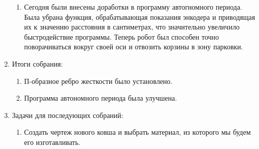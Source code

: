 \begin{enumerate}
\begin{enumerate}
	  \item Сегодня были внесены доработки в программу автогномного периода. Была убрана функция, обрабатывающая показания энкодера и приводящая их к значению расстояния в сантиметрах, что значительно увеличило быстродействие программы. Теперь робот был способен точно поворачиваться вокруг своей оси и отвозить корзины в зону парковки.
	  
    \end{enumerate}
    
	\item Итоги собрания: 
	\begin{enumerate}
	  \item П-образное ребро жесткости было установлено.
	  
	  \item Программа автономного периода была улучшена.
	  
    \end{enumerate}
    
	\item Задачи для последующих собраний:
	\begin{enumerate}
	  \item Создать чертеж нового ковша и выбрать материал, из которого мы будем его изготавливать.
	  
    \end{enumerate}     
\end{enumerate}
\fillpage